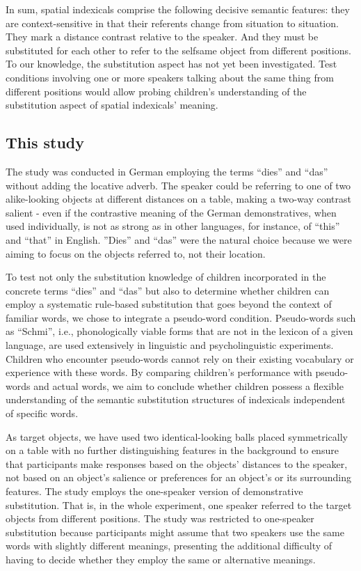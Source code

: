 \documentclass[
  man,floatsintext]{apa6}
\begin{document}
In sum, spatial indexicals comprise the following decisive semantic features: they are context-sensitive in that their referents change from situation to situation. They mark a distance contrast relative to the speaker. And they must be substituted for each other to refer to the selfsame object from different positions. To our knowledge, the substitution aspect has not yet been investigated. Test conditions involving one or more speakers talking about the same thing from different positions would allow probing children's understanding of the substitution aspect of spatial indexicals' meaning.

\subsection{This study}\label{this-study}

The study was conducted in German employing the terms ``dies'' and ``das'' without adding the locative adverb. The speaker could be referring to one of two alike-looking objects at different distances on a table, making a two-way contrast salient - even if the contrastive meaning of the German demonstratives, when used individually, is not as strong as in other languages, for instance, of ``this'' and ``that'' in English. ''Dies'' and ``das'' were the natural choice because we were aiming to focus on the objects referred to, not their location.

To test not only the substitution knowledge of children incorporated in the concrete terms ``dies'' and ``das'' but also to determine whether children can employ a systematic rule-based substitution that goes beyond the context of familiar words, we chose to integrate a pseudo-word condition. Pseudo-words such as ``Schmi'', i.e., phonologically viable forms that are not in the lexicon of a given language, are used extensively in linguistic and psycholinguistic experiments. Children who encounter pseudo-words cannot rely on their existing vocabulary or experience with these words. By comparing children's performance with pseudo-words and actual words, we aim to conclude whether children possess a flexible understanding of the semantic substitution structures of indexicals independent of specific words.

As target objects, we have used two identical-looking balls placed symmetrically on a table with no further distinguishing features in the background to ensure that participants make responses based on the objects' distances to the speaker, not based on an object's salience or preferences for an object's or its surrounding features. The study employs the one-speaker version of demonstrative substitution. That is, in the whole experiment, one speaker referred to the target objects from different positions. The study was restricted to one-speaker substitution because participants might assume that two speakers use the same words with slightly different meanings, presenting the additional difficulty of having to decide whether they employ the same or alternative meanings.
\end{document}
